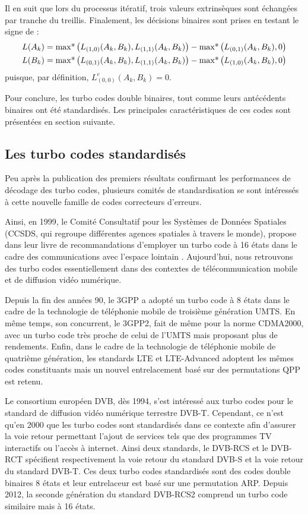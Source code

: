 Il en suit que lors du processus itératif, trois valeurs extrinsèques sont échangées par tranche du treillis.
Finalement, les décisions binaires sont prises en testant le signe de : 
\begin{align*}
	L(A_k) & = \operatorname*{max*} \left(L_{(1,0)}(A_k,B_k),L_{(1,1)}(A_k,B_k)\right) - \operatorname*{max*} \left(L_{(0,1)}(A_k,B_k),0\right) \\
	L(B_k) & = \operatorname*{max*} \left(L_{(0,1)}(A_k,B_k),L_{(1,1)}(A_k,B_k)\right) - \operatorname*{max*} \left(L_{(1,0)}(A_k,B_k),0\right) 
\end{align*}
puisque, par définition, $L^e_{(0,0)}(A_k,B_k)=0$.

Pour conclure, les turbo codes double binaires, tout comme leurs antécédents binaires ont été standardisés. Les 
principales caractéristiques de ces codes sont présentées en section suivante.

\subsection{Les turbo codes standardisés}
Peu après la publication des premiers résultats confirmant les performances de décodage des turbo codes, plusieurs 
comités de standardisation se sont intéressés à cette nouvelle famille de codes correcteurs d'erreurs.

Ainsi, en 1999, le Comité Consultatif pour les Systèmes de Données Spatiales (CCSDS, qui regroupe différentes agences 
spatiales à travers le monde), propose dans leur livre de recommandations d'employer un turbo code à 16 états dans le cadre 
des communications avec l'espace lointain \cite{ccsdsBluebook}. Aujourd'hui, nous retrouvons des turbo codes essentiellement dans des contextes de télécommunication mobile et de diffusion 
vidéo numérique.

Depuis la fin des années 90, le 3GPP a adopté un turbo code à 8 états dans le cadre de la technologie de téléphonie 
mobile de troisième génération UMTS. En même temps, son concurrent, le 3GPP2, fait de même pour la norme CDMA2000, avec 
un turbo code très proche de celui de l'UMTS mais proposant plus de rendements. 
Enfin, dans le cadre de la technologie de téléphonie mobile de quatrième génération, les standards LTE et LTE-Advanced 
\cite{lte} adoptent les mêmes codes constituants mais un nouvel entrelacement basé sur des permutations QPP est retenu.

Le consortium européen DVB, dès 1994, s'est intéressé aux turbo codes pour le standard de diffusion vidéo numérique 
terrestre DVB-T. Cependant, ce n'est qu'en 2000 que les turbo codes sont standardisés dans ce contexte afin d'assurer 
la voie retour permettant l'ajout de services tels que des programmes TV interactifs ou l’accès à internet. Ainsi deux 
standards, le DVB-RCS \cite{dvbrcs} et le DVB-RCT \cite{dvbrct} spécifient respectivement la voie retour du standard 
DVB-S et la voie retour du standard DVB-T. Ces deux turbo codes standardisés sont des codes double binaires 8 états et 
leur entrelaceur est basé sur une permutation ARP. Depuis 2012, la seconde génération du standard DVB-RCS2 \cite{dvbrcs2} 
comprend un turbo code similaire mais à 16 états.

